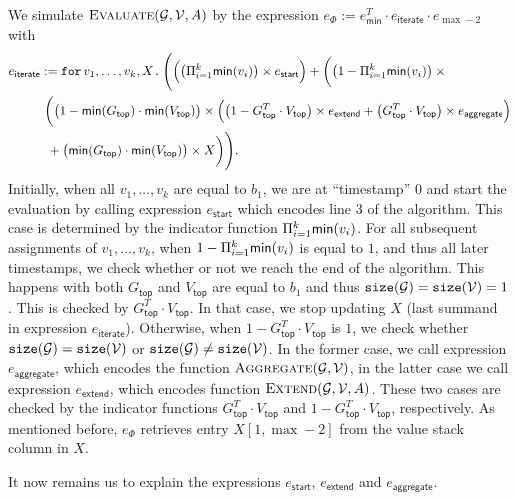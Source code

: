 We simulate $\textsc{Evaluate}(\mathcal{G},\mathcal{V},A)$ by the expression
$e_{\Phi}:= e_{\mathsf{min}}^T\cdot e_{\mathsf{iterate}}\cdot e_{\max -2}$ with
    \begin{align*}\allowdisplaybreaks
		e_{\mathsf{iterate}}&:= \ffor{v_1, \ldots, v_k}{X} \Biggl(\Bigl(\bigl( \sprod_{i=1}^k \mathsf{min}(v_i)\bigr) \times e_{\mathsf{start}}\Bigr) + 
        \biggl( \bigl(1- \sprod_{i=1}^k \mathsf{min}(v_i)\bigr)\times{}\\
        &\hspace{0.3em} \biggl( \bigl(1 -\mathsf{min}(G_{\mathsf{top}})\cdot \mathsf{min}(V_{\mathsf{top}})\bigr) \times \Bigl(\bigl( 1 - G_{\mathsf{top}}^T\cdot V_{\mathsf{top}}\bigr) \times e_{\mathsf{extend}} + 
        \bigl(G_{\mathsf{top}}^T\cdot V_{\mathsf{top}}\bigr) \times e_{\mathsf{aggregate}}\Bigl)  \\
        &\hspace{0.5em}+\bigl(\mathsf{min}(G_{\mathsf{top}})\cdot \mathsf{min}(V_{\mathsf{top}})\bigr)\times X\biggr)\Biggr).
	   \end{align*}
Initially, when all $v_1,\ldots,v_k$ are equal to $b_1$, we are at ``timestamp'' $0$ and start the evaluation by 
calling expression $e_{\mathsf{start}}$ which encodes line 3 of the algorithm. This case is determined by the indicator function
$ \Pi_{i=1}^k \mathsf{min}(v_i)$. For all subsequent assignments of $v_1,\ldots,v_k$, when $1- \Pi_{i=1}^k \mathsf{min}(v_i)$ is equal to $1$, and thus all
later timestamps, we check whether or not we reach the end of the algorithm. This happens with both $G_{\mathsf{top}}$ and $V_{\mathsf{top}}$ are equal to $b_1$
and thus $\texttt{size}(\mathcal{G})=\texttt{size}(\mathcal{V})=1$. This is checked by $G_{\mathsf{top}}^T\cdot V_{\mathsf{top}}$.
In that case, we stop updating $X$ (last summand in expression $e_{\mathsf{iterate}}$). Otherwise, when $1-G_{\mathsf{top}}^T\cdot V_{\mathsf{top}}$ is $1$, we check whether $\texttt{size}(\mathcal{G})=\texttt{size}(\mathcal{V})$ or $\texttt{size}(\mathcal{G})\neq \texttt{size}(\mathcal{V})$. In the former case, we call expression $e_{\mathsf{aggregate}}$, which encodes the function $\textsc{Aggregate}(\mathcal{G},\mathcal{V})$, in the latter case we call expression $e_{\mathsf{extend}}$, which encodes function $\textsc{Extend}(\mathcal{G},\mathcal{V},A)$. These two cases are checked by the indicator functions $G_{\mathsf{top}}^T\cdot V_{\mathsf{top}}$ and  $1 - G_{\mathsf{top}}^T\cdot V_{\mathsf{top}}$, respectively. As mentioned before, $e_\Phi$ retrieves entry $X[1,\max-2]$ from the value stack column in $X$. 

It now remains us to explain the expressions $e_{\mathsf{start}}$, $e_{\mathsf{extend}}$ and $e_{\mathsf{aggregate}}$.





